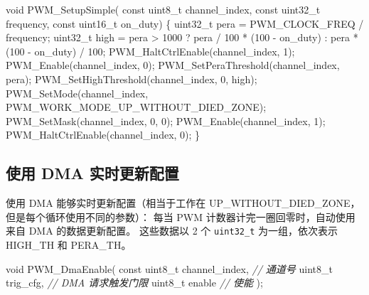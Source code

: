 \documentclass[
  12pt,
]{book}
\newenvironment{Shaded}{\begin{snugshade}}{\end{snugshade}}
\newcommand{\CommentTok}[1]{\textcolor[rgb]{0.56,0.35,0.01}{\textit{#1}}}
\newcommand{\DataTypeTok}[1]{\textcolor[rgb]{0.13,0.29,0.53}{#1}}
\newcommand{\DecValTok}[1]{\textcolor[rgb]{0.00,0.00,0.81}{#1}}
\newcommand{\NormalTok}[1]{#1}
\begin{document}
\begin{Shaded}
\begin{Highlighting}[]
\DataTypeTok{void}\NormalTok{ PWM_SetupSimple(}
    \DataTypeTok{const} \DataTypeTok{uint8_t}\NormalTok{ channel_index,}
    \DataTypeTok{const} \DataTypeTok{uint32_t}\NormalTok{ frequency,}
    \DataTypeTok{const} \DataTypeTok{uint16_t}\NormalTok{ on_duty)}
\NormalTok{\{}
    \DataTypeTok{uint32_t}\NormalTok{ pera = PWM_CLOCK_FREQ / frequency;}
    \DataTypeTok{uint32_t}\NormalTok{ high = pera > }\DecValTok{1000}\NormalTok{ ?}
\NormalTok{          pera / }\DecValTok{100}\NormalTok{ * (}\DecValTok{100}\NormalTok{ - on_duty)}
\NormalTok{        : pera * (}\DecValTok{100}\NormalTok{ - on_duty) / }\DecValTok{100}\NormalTok{;}
\NormalTok{    PWM_HaltCtrlEnable(channel_index, }\DecValTok{1}\NormalTok{);}
\NormalTok{    PWM_Enable(channel_index, }\DecValTok{0}\NormalTok{);}
\NormalTok{    PWM_SetPeraThreshold(channel_index, pera);}
\NormalTok{    PWM_SetHighThreshold(channel_index, }\DecValTok{0}\NormalTok{, high);}
\NormalTok{    PWM_SetMode(channel_index, PWM_WORK_MODE_UP_WITHOUT_DIED_ZONE);}
\NormalTok{    PWM_SetMask(channel_index, }\DecValTok{0}\NormalTok{, }\DecValTok{0}\NormalTok{);}
\NormalTok{    PWM_Enable(channel_index, }\DecValTok{1}\NormalTok{);}
\NormalTok{    PWM_HaltCtrlEnable(channel_index, }\DecValTok{0}\NormalTok{);}
\NormalTok{\}}
\end{Highlighting}
\end{Shaded}

\hypertarget{ux4f7fux7528-dma-ux5b9eux65f6ux66f4ux65b0ux914dux7f6e}{%
\subsection{使用 DMA 实时更新配置}\label{ux4f7fux7528-dma-ux5b9eux65f6ux66f4ux65b0ux914dux7f6e}}

使用 DMA 能够实时更新配置（相当于工作在 UP\_WITHOUT\_DIED\_ZONE，但是每个循环使用不同的参数）：
每当 PWM 计数器计完一圈回零时，自动使用来自 DMA 的数据更新配置。
这些数据以 2 个 \texttt{uint32\_t} 为一组，依次表示 HIGH\_TH 和 PERA\_TH。

\begin{Shaded}
\begin{Highlighting}[]
\DataTypeTok{void}\NormalTok{ PWM_DmaEnable(}
    \DataTypeTok{const} \DataTypeTok{uint8_t}\NormalTok{ channel_index, }\CommentTok{// 通道号}
    \DataTypeTok{uint8_t}\NormalTok{ trig_cfg,            }\CommentTok{// DMA 请求触发门限}
    \DataTypeTok{uint8_t}\NormalTok{ enable               }\CommentTok{// 使能}
\NormalTok{    );}
\end{Highlighting}
\end{Shaded}
\end{document}

